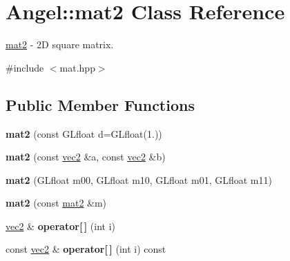 \hypertarget{class_angel_1_1mat2}{\section{Angel\-:\-:mat2 Class Reference}
\label{class_angel_1_1mat2}
}


\hyperlink{class_angel_1_1mat2}{mat2} -\/ 2\-D square matrix.  




{\ttfamily \#include $<$mat.\-hpp$>$}

\subsection*{Public Member Functions}
\begin{DoxyCompactItemize}
\item 
\hypertarget{class_angel_1_1mat2_ae102b820abff2323c45227b2b8bbf750}{{\bfseries mat2} (const G\-Lfloat d=G\-Lfloat(1.))}\label{class_angel_1_1mat2_ae102b820abff2323c45227b2b8bbf750}

\item 
\hypertarget{class_angel_1_1mat2_a28913fa178e1d31303701bfb68a18206}{{\bfseries mat2} (const \hyperlink{struct_angel_1_1vec2}{vec2} \&a, const \hyperlink{struct_angel_1_1vec2}{vec2} \&b)}\label{class_angel_1_1mat2_a28913fa178e1d31303701bfb68a18206}

\item 
\hypertarget{class_angel_1_1mat2_a922505784f3ff68666c32ea610d98579}{{\bfseries mat2} (G\-Lfloat m00, G\-Lfloat m10, G\-Lfloat m01, G\-Lfloat m11)}\label{class_angel_1_1mat2_a922505784f3ff68666c32ea610d98579}

\item 
\hypertarget{class_angel_1_1mat2_a4311450f6bb2b9c0413470c1877718f7}{{\bfseries mat2} (const \hyperlink{class_angel_1_1mat2}{mat2} \&m)}\label{class_angel_1_1mat2_a4311450f6bb2b9c0413470c1877718f7}

\item 
\hypertarget{class_angel_1_1mat2_a9cd43f0d8628af058eb2a8a45823558d}{\hyperlink{struct_angel_1_1vec2}{vec2} \& {\bfseries operator\mbox{[}$\,$\mbox{]}} (int i)}\label{class_angel_1_1mat2_a9cd43f0d8628af058eb2a8a45823558d}

\item 
\hypertarget{class_angel_1_1mat2_ae6f4de77d3e72ce41397fd5accdbbc4e}{const \hyperlink{struct_angel_1_1vec2}{vec2} \& {\bfseries operator\mbox{[}$\,$\mbox{]}} (int i) const }\label{class_angel_1_1mat2_ae6f4de77d3e72ce41397fd5accdbbc4e}


\end{DoxyCompactItemize}
